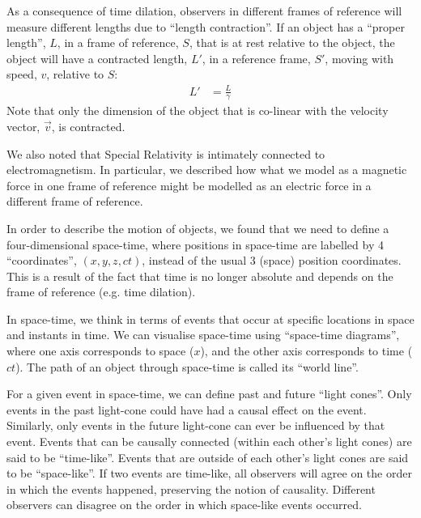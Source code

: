 \begin{chapterSummary}
As a consequence of time dilation, observers in different frames of reference will measure different lengths due to ``length contraction''. If an object has a ``proper length'', $L$, in a frame of reference, $S$, that is at rest relative to the object, the object will have a contracted length, $L'$, in a reference frame, $S'$, moving with speed, $v$, relative to $S$:
\begin{align*}
L'&=\frac{L}{\gamma}
\end{align*} 
Note that only the dimension of the object that is co-linear with the velocity vector, $\vec v$, is contracted. 

We also noted that Special Relativity is intimately connected to electromagnetism. In particular, we described how what we model as a magnetic force in one frame of reference might be modelled as an electric force in a different frame of reference.

In order to describe the motion of objects, we found that we need to define a four-dimensional space-time, where positions in space-time are labelled by 4 ``coordinates'', $(x,y,z,ct)$, instead of the usual 3 (space) position coordinates. This is a result of the fact that time is no longer absolute and depends on the frame of reference (e.g. time dilation). 

In space-time, we think in terms of events that occur at specific locations in space and instants in time. We can visualise space-time using ``space-time diagrams'', where one axis corresponds to space ($x$), and the other axis corresponds to time ($ct$). The path of an object through space-time is called its ``world line''. 

For a given event in space-time, we can define past and future ``light cones''. Only events in the past light-cone could have had a causal effect on the event. Similarly, only events in the future light-cone can ever be influenced by that event. Events that can be causally connected (within each other's light cones) are said to be ``time-like''. Events that are outside of each other's light cones are said to be ``space-like''. If two events are time-like, all observers will agree on the order in which the events happened, preserving the notion of causality. Different observers can disagree on the order in which space-like events occurred. 


\end{chapterSummary}
